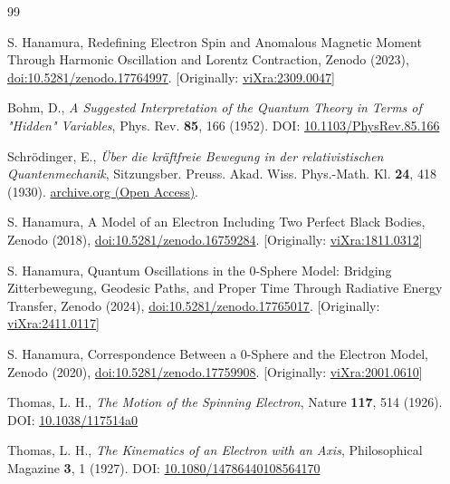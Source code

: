 \documentclass[%
 reprint,
 amsmath,amssymb,
 aps,
]{revtex4-1}
\numberwithin{equation}{section}%
\begin{document}
\begin{thebibliography}{99}

S. Hanamura, Redefining Electron Spin and Anomalous Magnetic Moment Through Harmonic Oscillation and Lorentz Contraction, Zenodo (2023), \href{https://doi.org/10.5281/zenodo.17764997}{doi:10.5281/zenodo.17764997}. [Originally: \href{https://vixra.org/abs/2309.0047}{viXra:2309.0047}]

 Bohm, D., 
\textit{A Suggested Interpretation of the Quantum Theory in Terms of "Hidden" Variables}, 
Phys. Rev. \textbf{85}, 166 (1952). DOI: \href{https://doi.org/10.1103/PhysRev.85.166}{10.1103/PhysRev.85.166}

Schr\"{o}dinger, E.,
\textit{Über die kräftfreie Bewegung in der relativistischen Quantenmechanik}, 
Sitzungsber. Preuss. Akad. Wiss. Phys.-Math. Kl. \textbf{24}, 418 (1930). 
\href{https://archive.org/details/uberderkrarelativistischenquantenmechanikschrodinger19300717english}{archive.org  (Open Access)}.

S. Hanamura, A Model of an Electron Including Two Perfect Black Bodies, Zenodo (2018), \href{https://doi.org/10.5281/zenodo.16759284}{doi:10.5281/zenodo.16759284}. [Originally: \href{https://vixra.org/abs/1811.0312}{viXra:1811.0312}]

S. Hanamura, Quantum Oscillations in the 0-Sphere Model: Bridging Zitterbewegung, Geodesic Paths, and Proper Time Through Radiative Energy Transfer, Zenodo (2024), \href{https://doi.org/10.5281/zenodo.17765017}{doi:10.5281/zenodo.17765017}. [Originally: \href{https://vixra.org/abs/2411.0117}{viXra:2411.0117}]

S. Hanamura, Correspondence Between a 0-Sphere and the Electron Model, Zenodo (2020), \href{https://doi.org/10.5281/zenodo.17759908}{doi:10.5281/zenodo.17759908}. [Originally: \href{https://vixra.org/abs/2001.0610}{viXra:2001.0610}]

 Thomas, L. H., 
\textit{The Motion of the Spinning Electron}, 
Nature \textbf{117}, 514 (1926). DOI: \href{https://doi.org/10.1038/117514a0}{10.1038/117514a0}

 Thomas, L. H., 
\textit{The Kinematics of an Electron with an Axis}, 
Philosophical Magazine \textbf{3}, 1 (1927). DOI: \href{https://doi.org/10.1080/14786440108564170}{10.1080/14786440108564170}


\end{thebibliography}
\end{document}
